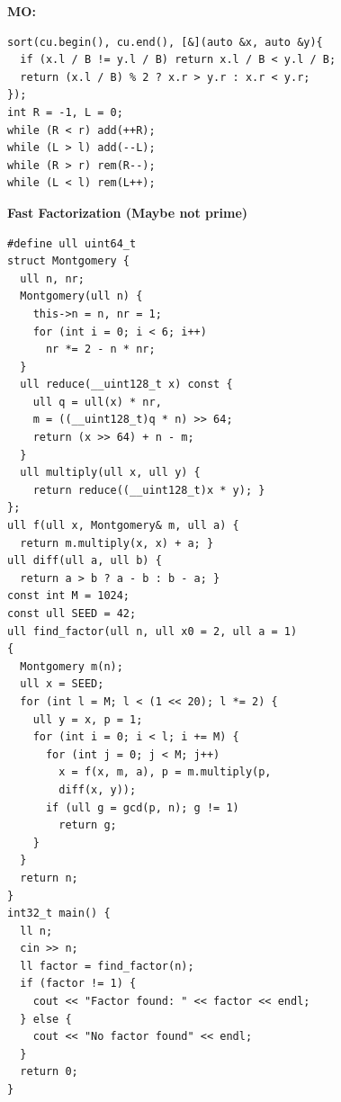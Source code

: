 
\textbf{MO:}
\begin{lstlisting}
sort(cu.begin(), cu.end(), [&](auto &x, auto &y){
  if (x.l / B != y.l / B) return x.l / B < y.l / B;
  return (x.l / B) % 2 ? x.r > y.r : x.r < y.r;
});
int R = -1, L = 0;
while (R < r) add(++R);
while (L > l) add(--L);
while (R > r) rem(R--);
while (L < l) rem(L++);
\end{lstlisting}

\textbf{Fast Factorization (Maybe not prime)}
\begin{lstlisting}
#define ull uint64_t
struct Montgomery {
  ull n, nr;
  Montgomery(ull n) {
    this->n = n, nr = 1;
    for (int i = 0; i < 6; i++)
      nr *= 2 - n * nr;
  }
  ull reduce(__uint128_t x) const {
    ull q = ull(x) * nr,
    m = ((__uint128_t)q * n) >> 64;
    return (x >> 64) + n - m;
  }
  ull multiply(ull x, ull y) {
    return reduce((__uint128_t)x * y); }
};
ull f(ull x, Montgomery& m, ull a) {
  return m.multiply(x, x) + a; }
ull diff(ull a, ull b) {
  return a > b ? a - b : b - a; }
const int M = 1024;
const ull SEED = 42;
ull find_factor(ull n, ull x0 = 2, ull a = 1)
{
  Montgomery m(n);
  ull x = SEED;
  for (int l = M; l < (1 << 20); l *= 2) {
    ull y = x, p = 1;
    for (int i = 0; i < l; i += M) {
      for (int j = 0; j < M; j++)
        x = f(x, m, a), p = m.multiply(p,
        diff(x, y));
      if (ull g = gcd(p, n); g != 1)
        return g;
    }
  }
  return n;
}
int32_t main() {
  ll n;
  cin >> n;
  ll factor = find_factor(n);
  if (factor != 1) {
    cout << "Factor found: " << factor << endl;
  } else {
    cout << "No factor found" << endl;
  }
  return 0;
}
\end{lstlisting}

